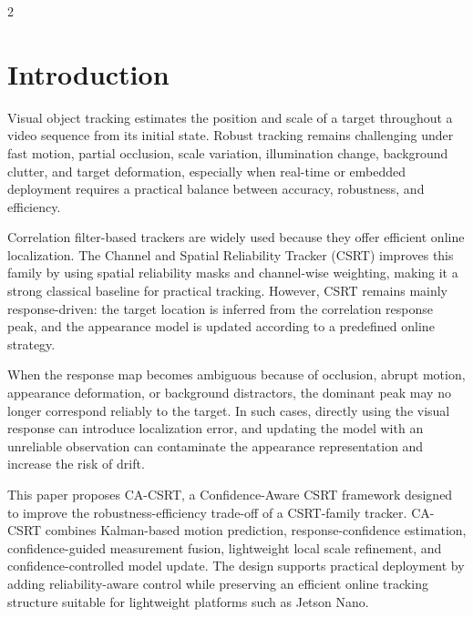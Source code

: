 \documentclass[10pt,a4paper]{article}
\begin{document}
\begin{multicols}{2}

\section{Introduction}

Visual object tracking estimates the position and scale of a target throughout a video sequence from its initial state. Robust tracking remains challenging under fast motion, partial occlusion, scale variation, illumination change, background clutter, and target deformation, especially when real-time or embedded deployment requires a practical balance between accuracy, robustness, and efficiency.

Correlation filter-based trackers are widely used because they offer efficient online localization. The Channel and Spatial Reliability Tracker (CSRT) improves this family by using spatial reliability masks and channel-wise weighting, making it a strong classical baseline for practical tracking. However, CSRT remains mainly response-driven: the target location is inferred from the correlation response peak, and the appearance model is updated according to a predefined online strategy.

When the response map becomes ambiguous because of occlusion, abrupt motion, appearance deformation, or background distractors, the dominant peak may no longer correspond reliably to the target. In such cases, directly using the visual response can introduce localization error, and updating the model with an unreliable observation can contaminate the appearance representation and increase the risk of drift.

This paper proposes CA-CSRT, a Confidence-Aware CSRT framework designed to improve the robustness-efficiency trade-off of a CSRT-family tracker. CA-CSRT combines Kalman-based motion prediction, response-confidence estimation, confidence-guided measurement fusion, lightweight local scale refinement, and confidence-controlled model update. The design supports practical deployment by adding reliability-aware control while preserving an efficient online tracking structure suitable for lightweight platforms such as Jetson Nano.


\end{multicols}
\end{document}
